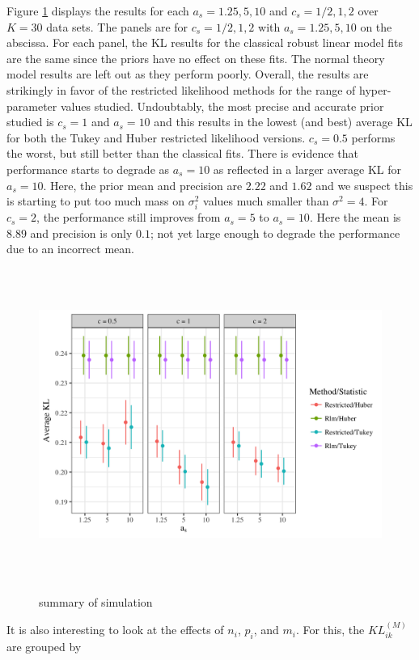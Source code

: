 \documentclass[12pt]{article}
\begin{document}
Figure \ref{kl_sim} displays the results for each $a_{s} = 1.25,  5, 10$ and $c_{s} = 1/2, 1, 2$ over $K = 30$ data sets. The panels are for $c_{s} = 1/2, 1, 2$ with $a_{s} = 1.25,  5, 10$ on the abscissa. For each panel, the KL results for the classical robust linear model fits are the same since the priors have no effect on these fits. The normal theory model results are left out as they perform poorly. Overall, the results are strikingly in favor of the restricted likelihood methods for the range of hyper-parameter values studied. Undoubtably, the most precise and accurate prior studied is  $c_{s} = 1$ and $a_{s} = 10$ and this results in the lowest (and best) average KL for both the Tukey and Huber restricted likelihood versions. $c_{s} = 0.5$ performs the worst, but still better than the classical fits. There is evidence that performance starts to degrade as $a_{s} = 10$ as reflected in a larger average KL for $a_{s} = 10$. Here, the prior mean and precision are $2.22$ and $1.62$ and we suspect this is starting to put too much mass on $\sigma^{2}_{i}$ values much smaller than $\sigma^{2}=4$. For $c_{s} = 2$, the performance still improves from $a_{s} = 5$ to $a_{s} = 10$. Here the mean is $8.89$ and precision is only $0.1$; not yet large enough to degrade the performance due to an incorrect mean.   
 
\begin{figure}[H]
\centering
\includegraphics[width = 6in, height = 4in]{kl_sim2_facet_scale.png}
\label{kl_sim}
\caption{summary of simulation}
\end{figure}

It is also interesting to look at the effects of $n_{i}$, $p_{i}$, and $m_{i}$. For this, the  $KL^{(M)}_{ik}$ are grouped by 
\end{document}
